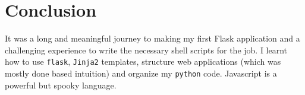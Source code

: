 \documentclass[11pt]{scrartcl}
\begin{document}
\section{Conclusion}

It was a long and meaningful journey to making my first Flask application and a
challenging experience to write the necessary shell scripts for the job. I
learnt how to use \texttt{flask}, \texttt{Jinja2} templates, structure web
applications (which was mostly done based intuition) and organize my
\texttt{python} code. Javascript is a powerful but spooky language.

\newpage


\end{document}
